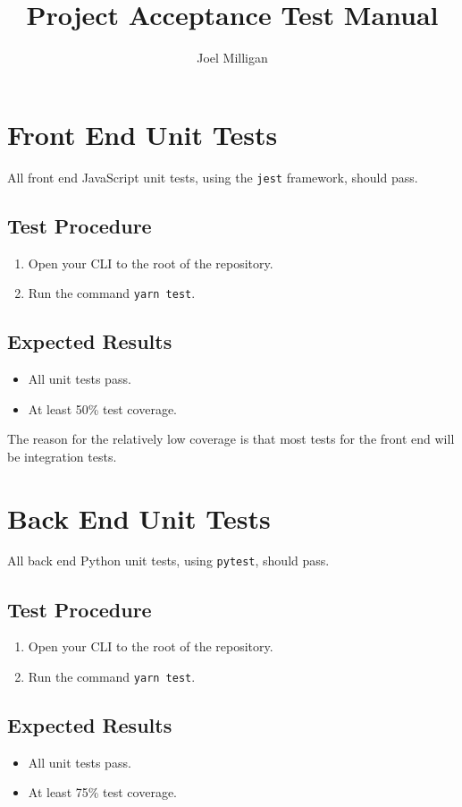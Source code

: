 \documentclass[a4paper, draft]{article}
\author{Joel Milligan}
\title{Project Acceptance Test Manual}
\date{}
\begin{document}
\maketitle
\tableofcontents

\newpage
\section{Front End Unit Tests}
All front end JavaScript unit tests, using the \texttt{jest} framework, should pass.

\subsection{Test Procedure}
\begin{enumerate}
    \item Open your CLI to the root of the repository.
    \item Run the command \texttt{yarn test}.
\end{enumerate}

\subsection{Expected Results}
\begin{itemize}
    \item All unit tests pass.
    \item At least 50\% test coverage.
\end{itemize}
The reason for the relatively low coverage is that most tests for the front end will be integration tests.

\section{Back End Unit Tests}
All back end Python unit tests, using \texttt{pytest}, should pass.

\subsection{Test Procedure}
\begin{enumerate}
    \item Open your CLI to the root of the repository.
    \item Run the command \texttt{yarn test}.
\end{enumerate}

\subsection{Expected Results}
\begin{itemize}
    \item All unit tests pass.
    \item At least 75\% test coverage.
\end{itemize}
\end{document}
